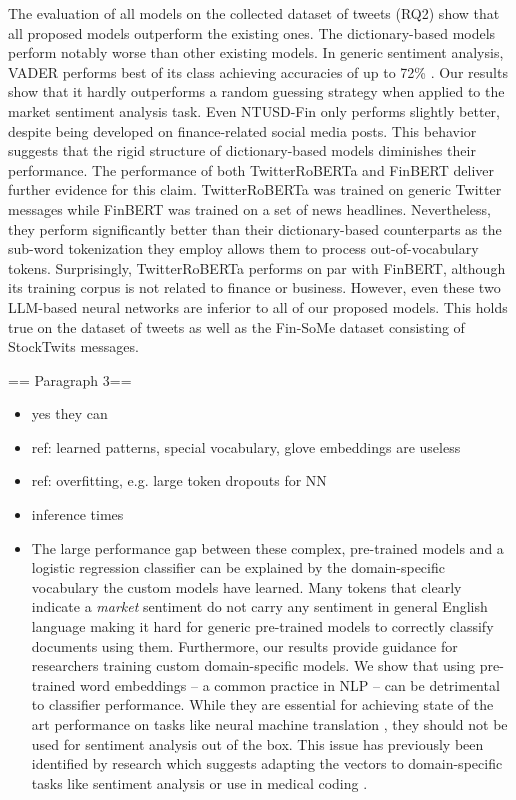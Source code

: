 The evaluation of all models on the collected dataset of tweets (RQ2) show that all proposed models outperform the existing ones. The dictionary-based models perform notably worse than other existing models. In generic sentiment analysis, VADER performs best of its class achieving accuracies of up to 72\% . Our results show that it hardly outperforms a random guessing strategy when applied to the market sentiment analysis task. Even NTUSD-Fin only performs slightly better, despite being developed on finance-related social media posts. This behavior suggests that the rigid structure of dictionary-based models diminishes their performance. The performance of both TwitterRoBERTa and FinBERT deliver further evidence for this claim. TwitterRoBERTa was trained on generic Twitter messages while FinBERT was trained on a set of news headlines. Nevertheless, they perform significantly better than their dictionary-based counterparts as the sub-word tokenization they employ allows them to process out-of-vocabulary tokens. Surprisingly, TwitterRoBERTa performs on par with FinBERT, although its training corpus is not related to finance or business. However, even these two LLM-based neural networks are inferior to all of our proposed models. This holds true on the dataset of tweets as well as the Fin-SoMe dataset consisting of StockTwits messages.


== Paragraph 3==\\
\begin{itemize}[noitemsep]
	\item yes they can
	\item ref: learned patterns, special vocabulary, glove embeddings are useless	
	\item ref: overfitting, e.g. large token dropouts for NN
 	\item inference times
	\item The large performance gap between these complex, pre-trained models and a logistic regression classifier can be explained by the domain-specific vocabulary the custom models have learned. Many tokens that clearly indicate a \emph{market} sentiment do not carry any sentiment in general English language making it hard for generic pre-trained models to correctly classify documents using them. Furthermore, our results provide guidance for researchers training custom domain-specific models. We show that using pre-trained word embeddings -- a common practice in NLP -- can be detrimental to classifier performance. While they are essential for achieving state of the art performance on tasks like neural machine translation , they should not be used for sentiment analysis out of the box. This issue has previously been identified by research which suggests adapting the vectors to domain-specific tasks like sentiment analysis  or use in medical coding .

\end{itemize}



